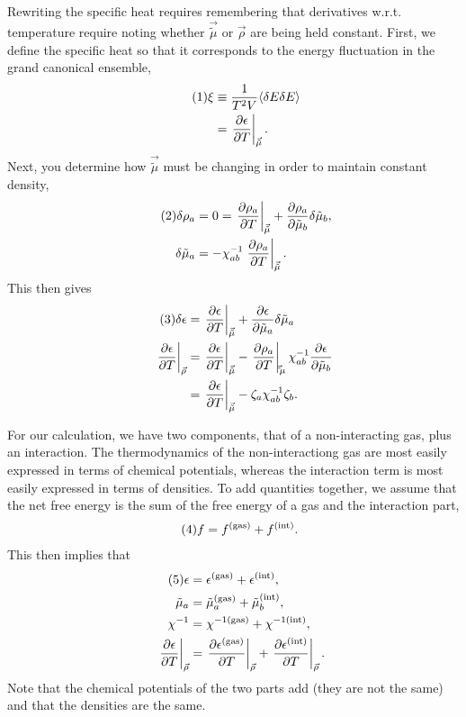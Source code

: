 \documentclass[12pt]{article}
\numberwithin{equation}{section}
\numberwithin{figure}{section}
\newcommand\eqnumber{\addtocounter{equation}{1}\tag{\theequation}}
\begin{document}
Rewriting the specific heat requires remembering that derivatives w.r.t. temperature require noting whether $\vec{\tilde{\mu}}$ or $\vec{\rho}$ are being held constant. First, we define the specific heat so that it corresponds to the energy fluctuation in the grand canonical ensemble,
\begin{align*}\eqnumber
\xi&\equiv\frac{1}{T^2V}\langle\delta E\delta E\rangle\\
&=\left.\frac{\partial\epsilon}{\partial T}\right|_{\vec{\tilde{\mu}}}.
\end{align*}
Next, you determine how $\vec{\tilde{\mu}}$ must be changing in order to maintain constant density,
\begin{align*}\eqnumber
\delta\rho_a&=0=\left.\frac{\partial\rho_a}{\partial T}\right|_{\vec{\tilde{\mu}}}+\frac{\partial\rho_a}{\partial\tilde{\mu}_b}\delta\tilde{\mu}_b,\\
\delta\tilde{\mu}_a&=-\chi^{-1}_{ab}\left.\frac{\partial\rho_a}{\partial T}\right|_{\vec{\tilde{\mu}}}.
\end{align*}
This then gives
\begin{align*}\eqnumber
\delta\epsilon&=\left.\frac{\partial\epsilon}{\partial T}\right|_{\vec{\tilde{\mu}}}+\frac{\partial\epsilon}{\partial\tilde{\mu}_a}\delta\tilde{\mu}_a\\
\left.\frac{\partial\epsilon}{\partial T}\right|_{\vec{\rho}}
&=\left.\frac{\partial\epsilon}{\partial T}\right|_{\vec{\tilde{\mu}}}-\left.\frac{\partial\rho_a}{\partial T}\right|_{\vec\tilde{\mu}}\chi^{-1}_{ab}\frac{\partial\epsilon}{\partial\tilde{\mu}_b}\\
&=\left.\frac{\partial\epsilon}{\partial T}\right|_{\vec{\tilde{\mu}}}-\zeta_a\chi^{-1}_{ab}\zeta_b.
\end{align*}

For our calculation, we have two components, that of a non-interacting gas, plus an interaction. The thermodynamics of the non-interactiong gas are most easily expressed in terms of chemical potentials, whereas the interaction term is most easily expressed in terms of densities. To add quantities together, we assume that the net free energy is the sum of the free energy of a gas and the interaction part,
\begin{align*}\eqnumber
f&=f^{\rm(gas)}+f^{\rm(int)}.
\end{align*}
This then implies that
\begin{align*}\eqnumber
\epsilon&=\epsilon^{\rm(gas)}+\epsilon^{\rm(int)},\\
\tilde{\mu}_a&=\tilde{\mu}_a^{\rm(gas)}+\tilde{\mu}_b^{\rm(int)},\\
\chi^{-1}&=\chi^{-1{\rm(gas)}}+\chi^{-1{\rm(int)}},\\
\left.\frac{\partial\epsilon}{\partial T}\right|_{\vec{\rho}}&=
\left.\frac{\partial\epsilon^{\rm(gas)}}{\partial T}\right|_{\vec{\rho}}
+\left.\frac{\partial\epsilon^{\rm(int)}}{\partial T}\right|_{\vec{\rho}}.
\end{align*}
Note that the chemical potentials of the two parts add (they are not the same) and that the densities are the same. 
\end{document}
